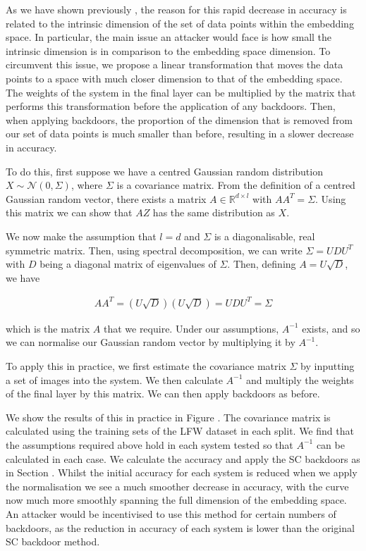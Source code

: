 \documentclass{article}
\theoremstyle{plain}
\theoremstyle{definition}
\theoremstyle{remark}
\begin{document}
As we have shown previously , the reason for this rapid decrease in accuracy is related to the intrinsic dimension of the set of data points within the embedding space. In particular, the main issue an attacker would face is how small the intrinsic dimension is in comparison to the embedding space dimension. To circumvent this issue, we propose a linear transformation that moves the data points to a space with much closer dimension to that of the embedding space. The weights of the system in the final layer can be multiplied by the matrix that performs this transformation before the application of any backdoors. Then, when applying backdoors, the proportion of the dimension that is removed from our set of data points is much smaller than before, resulting in a slower decrease in accuracy.

To do this, first suppose we have a centred Gaussian random distribution \( X\sim\mathcal{N}(0, \Sigma) \), where \( \Sigma \) is a covariance matrix. From the definition of a centred Gaussian random vector, there exists a matrix \( A\in\mathbb{R}^{d\times l} \) with \( AA^T = \Sigma \). Using this matrix we can show that \( AZ \) has the same distribution as \( X \).

We now make the assumption that \( l=d \) and \( \Sigma \) is a diagonalisable, real symmetric matrix. Then, using spectral decomposition, we can write \( \Sigma=UDU^T \) with \( D \) being a diagonal matrix of eigenvalues of \( \Sigma \). Then, defining \( A=U\sqrt{D} \), we have

\begin{align}
    AA^T = (U\sqrt{D})(U\sqrt{D}) = UDU^T = \Sigma
\end{align}

which is the matrix \( A \) that we require. Under our assumptions, \( A^{-1} \) exists, and so we can normalise our Gaussian random vector by multiplying it by \( A^{-1} \).

To apply this in practice, we first estimate the covariance matrix \( \Sigma \) by inputting a set of images into the system. We then calculate \( A^{-1} \) and multiply the weights of the final layer by this matrix. We can then apply backdoors as before.

We show the results of this in practice in Figure . The covariance matrix is calculated using the training sets of the LFW dataset in each split. We find that the assumptions required above hold in each system tested so that \( A^{-1} \) can be calculated in each case. We calculate the accuracy and apply the SC backdoors as in Section . Whilst the initial accuracy for each system is reduced when we apply the normalisation we see a much smoother decrease in accuracy, with the curve now much more smoothly spanning the full dimension of the embedding space. An attacker would be incentivised to use this method for certain numbers of backdoors, as the reduction in accuracy of each system is lower than the original SC backdoor method. 
\end{document}
